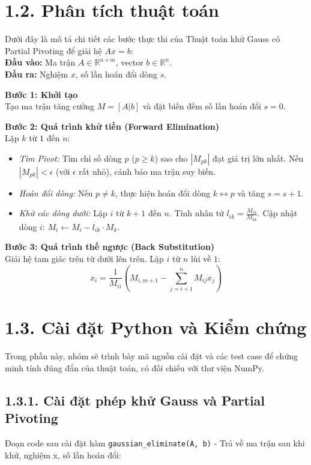 \section*{1.2. Phân tích thuật toán}
{}
Dưới đây là mô tả chi tiết các bước thực thi của Thuật toán khử Gauss có Partial Pivoting để giải hệ $Ax = b$:
\\
\textbf{Đầu vào:} Ma trận $A \in \mathbb{R}^{n \times m}$, vector $b \in \mathbb{R}^{n}$.\\
\textbf{Đầu ra:} Nghiệm $x$, số lần hoán đổi dòng $s$.

\textbf{Bước 1: Khởi tạo}\\
Tạo ma trận tăng cường $M = [A|b]$ và đặt biến đếm số lần hoán đổi $s = 0$.

\textbf{Bước 2: Quá trình khử tiến (Forward Elimination)}\\
Lặp $k$ từ $1$ đến $n$:
\begin{itemize}
    \item \textit{Tìm Pivot:} Tìm chỉ số dòng $p$ ($p \ge k$) sao cho $|M_{pk}|$ đạt giá trị lớn nhất. Nếu $|M_{pk}| < \epsilon$ (với $\epsilon$ rất nhỏ), cảnh báo ma trận suy biến.
    \item \textit{Hoán đổi dòng:} Nếu $p \neq k$, thực hiện hoán đổi dòng $k \leftrightarrow p$ và tăng $s = s + 1$.
    \item \textit{Khử các dòng dưới:} Lặp $i$ từ $k+1$ đến $n$. Tính nhân tử $l_{ik} = \frac{M_{ik}}{M_{kk}}$. Cập nhật dòng $i$: $M_{i} \leftarrow M_{i} - l_{ik} \cdot M_{k}$.
\end{itemize}

\textbf{Bước 3: Quá trình thế ngược (Back Substitution)}\\
Giải hệ tam giác trên từ dưới lên trên. Lặp $i$ từ $n$ lùi về $1$:
$$x_{i} = \frac{1}{M_{ii}} \left( M_{i, m+1} - \sum_{j=i+1}^{n} M_{ij}x_{j} \right)$$
\section*{1.3. Cài đặt Python và Kiểm chứng}
{}

Trong phần này, nhóm sẽ trình bày mã nguồn cài đặt và các test case để chứng minh tính đúng đắn của thuật toán, có đối chiếu với thư viện NumPy.

\subsection*{1.3.1. Cài đặt phép khử Gauss và Partial Pivoting}
{}
Đoạn code sau cài đặt hàm \texttt{gaussian\_eliminate(A, b)} - Trả về ma trận sau khi khử, nghiệm x, số lần hoán đổi:

